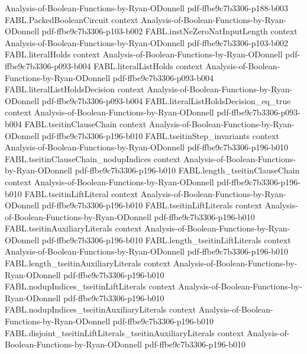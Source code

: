 \begin{theorem}
  {Analysis-of-Boolean-Functions-by-Ryan-ODonnell}
  {pdf-ffbe9c7b3306-p188-b003}
\proofstep
  {FABL.PackedBooleanCircuit}
  {context}
  {Analysis-of-Boolean-Functions-by-Ryan-ODonnell}
  {pdf-ffbe9c7b3306-p103-b002}
\proofstep
  {FABL.instNeZeroNatInputLength}
  {context}
  {Analysis-of-Boolean-Functions-by-Ryan-ODonnell}
  {pdf-ffbe9c7b3306-p103-b002}
\proofstep
  {FABL.literalHolds}
  {context}
  {Analysis-of-Boolean-Functions-by-Ryan-ODonnell}
  {pdf-ffbe9c7b3306-p093-b004}
\proofstep
  {FABL.literalListHolds}
  {context}
  {Analysis-of-Boolean-Functions-by-Ryan-ODonnell}
  {pdf-ffbe9c7b3306-p093-b004}
\proofstep
  {FABL.literalListHoldsDecision}
  {context}
  {Analysis-of-Boolean-Functions-by-Ryan-ODonnell}
  {pdf-ffbe9c7b3306-p093-b004}
\proofstep
  {FABL.literalListHoldsDecision_eq_true}
  {context}
  {Analysis-of-Boolean-Functions-by-Ryan-ODonnell}
  {pdf-ffbe9c7b3306-p093-b004}
\proofstep
  {FABL.tseitinClauseChain}
  {context}
  {Analysis-of-Boolean-Functions-by-Ryan-ODonnell}
  {pdf-ffbe9c7b3306-p196-b010}
\proofstep
  {FABL.tseitinStep_invariants}
  {context}
  {Analysis-of-Boolean-Functions-by-Ryan-ODonnell}
  {pdf-ffbe9c7b3306-p196-b010}
\proofstep
  {FABL.tseitinClauseChain_nodupIndices}
  {context}
  {Analysis-of-Boolean-Functions-by-Ryan-ODonnell}
  {pdf-ffbe9c7b3306-p196-b010}
\proofstep
  {FABL.length_tseitinClauseChain}
  {context}
  {Analysis-of-Boolean-Functions-by-Ryan-ODonnell}
  {pdf-ffbe9c7b3306-p196-b010}
\proofstep
  {FABL.tseitinLiftLiteral}
  {context}
  {Analysis-of-Boolean-Functions-by-Ryan-ODonnell}
  {pdf-ffbe9c7b3306-p196-b010}
\proofstep
  {FABL.tseitinLiftLiterals}
  {context}
  {Analysis-of-Boolean-Functions-by-Ryan-ODonnell}
  {pdf-ffbe9c7b3306-p196-b010}
\proofstep
  {FABL.tseitinAuxiliaryLiterals}
  {context}
  {Analysis-of-Boolean-Functions-by-Ryan-ODonnell}
  {pdf-ffbe9c7b3306-p196-b010}
\proofstep
  {FABL.length_tseitinLiftLiterals}
  {context}
  {Analysis-of-Boolean-Functions-by-Ryan-ODonnell}
  {pdf-ffbe9c7b3306-p196-b010}
\proofstep
  {FABL.length_tseitinAuxiliaryLiterals}
  {context}
  {Analysis-of-Boolean-Functions-by-Ryan-ODonnell}
  {pdf-ffbe9c7b3306-p196-b010}
\proofstep
  {FABL.nodupIndices_tseitinLiftLiterals}
  {context}
  {Analysis-of-Boolean-Functions-by-Ryan-ODonnell}
  {pdf-ffbe9c7b3306-p196-b010}
\proofstep
  {FABL.nodupIndices_tseitinAuxiliaryLiterals}
  {context}
  {Analysis-of-Boolean-Functions-by-Ryan-ODonnell}
  {pdf-ffbe9c7b3306-p196-b010}
\proofstep
  {FABL.disjoint_tseitinLiftLiterals_tseitinAuxiliaryLiterals}
  {context}
  {Analysis-of-Boolean-Functions-by-Ryan-ODonnell}
  {pdf-ffbe9c7b3306-p196-b010}

\end{theorem}
